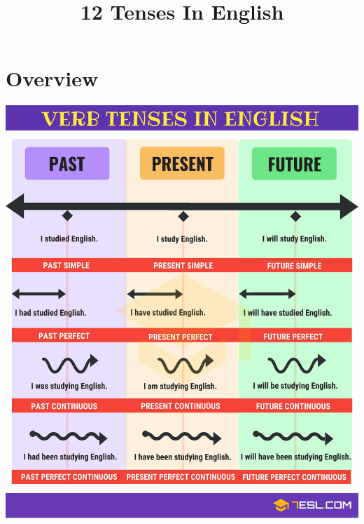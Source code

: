 \title{\Huge \textbf{12 Tenses In English}}

\maketitle
\tableofcontents
\newcommand{\structure}[3]{
    \newcolbox{Structure}{
        \begin{tabular}{l|l}
            \green{(+)}&#1\\
            \red{(-)}&#2\\
            \yellow{(?)}&#3\\
        \end{tabular}
    }
}
\newcommand{\dStructure}[6]{
    \newcolbox{Structure}{
        \begin{tabular}{l|l}
            \green{(+)}&#1\\
            \red{(-)}&#2\\
            \yellow{(?)}&#3\\
            \hline
            \green{(+)}&#4\\
            \red{(-)}&#5\\
            \yellow{(?)}&#6\\
        \end{tabular}
    }
}

\chapter{Overview}
\centering
\includegraphics[width=\textwidth]{project-folders/12Tenses/englishTensesOverView.jpg} 

